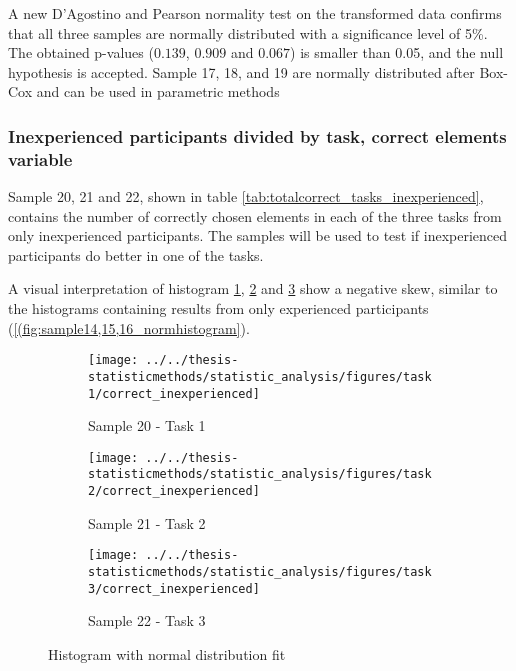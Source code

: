 A new D'Agostino and Pearson normality test on the transformed data confirms that all three samples are normally distributed with a significance level of 5\%. The obtained p-values ($0.139$, $0.909$ and $0.067$) is smaller than 0.05, and the null hypothesis is accepted. Sample 17, 18, and 19 are normally distributed after Box-Cox and can be used in parametric methods \\[0.2cm]

\subsubsection[Sample 20, 21 and 22]{Inexperienced participants  divided by task, correct elements variable}\label{sec:sample_20,21,22_normalitytest}
Sample 20, 21 and 22, shown in table \ref{tab:totalcorrect_tasks_inexperienced}, contains the number of correctly chosen elements in each of the three tasks from only inexperienced participants. The samples will be used to test if inexperienced participants do better in one of the tasks. 

A visual interpretation of histogram \ref{fig:correctinexperienced_task1}, \ref{fig:correctinexperienced_task2} and \ref{fig:correctinexperienced_task3} show a negative skew, similar to the histograms containing results from only experienced participants (\ref{(fig:sample14,15,16_normhistogram}).

\begin{figure}[H]
	\centering
	\begin{subfigure}[b]{0.32\textwidth}
		\centering
		\texttt{[image: ../../thesis-statisticmethods/statistic\_analysis/figures/task1/correct\_inexperienced]}
		\caption{Sample 20 - Task 1}
		\label{fig:correctinexperienced_task1}
	\end{subfigure}
	\begin{subfigure}[b]{0.32\textwidth}
		\centering
		\texttt{[image: ../../thesis-statisticmethods/statistic\_analysis/figures/task2/correct\_inexperienced]}
		\caption{Sample 21 - Task 2}
		\label{fig:correctinexperienced_task2}
	\end{subfigure}
	\begin{subfigure}[b]{0.32\textwidth}
		\centering
		\texttt{[image: ../../thesis-statisticmethods/statistic\_analysis/figures/task3/correct\_inexperienced]}
		\caption{Sample 22 - Task 3}
		\label{fig:correctinexperienced_task3}
	\end{subfigure}
	\caption{Histogram with normal distribution fit}
	\label{fig:sample20,21,22_normtest_original}
\end{figure}

